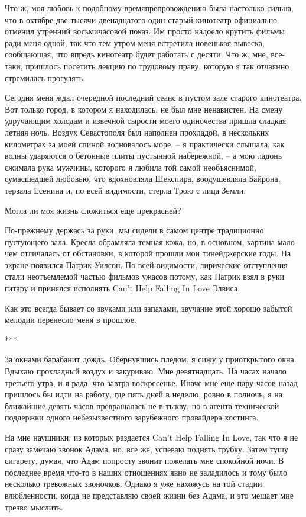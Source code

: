 \documentclass[
]{book}
\begin{document}
Что ж, моя любовь к подобному времяпрепровождению была настолько сильна, что в октябре две тысячи двенадцатого один старый кинотеатр официально отменил утренний восьмичасовой показ. Им просто надоело крутить фильмы ради меня одной, так что тем утром меня встретила новенькая вывеска, сообщающая, что впредь кинотеатр будет работать с десяти. Что ж, мне, все-таки, пришлось посетить лекцию по трудовому праву, которую я так отчаянно стремилась прогулять.

Сегодня меня ждал очередной последний сеанс в пустом зале старого кинотеатра. Вот только город, в котором я находилась, не был мне ненавистен. На смену удручающим холодам и извечной сырости моего одиночества пришла сладкая летняя ночь. Воздух Севастополя был наполнен прохладой, в нескольких километрах за моей спиной волновалось море, -- я практически слышала, как волны ударяются о бетонные плиты пустынной набережной, -- а мою ладонь сжимала рука мужчины, которого я любила той самой необъяснимой, сумасшедшей любовью, что вдохновляла Шекспира, воодушевляла Байрона, терзала Есенина и, по всей видимости, стерла Трою с лица Земли.

Могла ли моя жизнь сложиться еще прекрасней?

По-прежнему держась за руки, мы сидели в самом центре традиционно пустующего зала. Кресла обрамляла темная кожа, но, в основном, картина мало чем отличалась от обстановки, в которой прошли мои тинейджерские годы. На экране появился Патрик Уилсон. По всей видимости, лирические отступления стали неотъемлемой частью фильмов ужасов потому, как Патрик взял в руки гитару и принялся исполнять Can't Help Falling In Love Элвиса.

Как это всегда бывает со звуками или запахами, звучание этой хорошо забытой мелодии перенесло меня в прошлое.

***

За окнами барабанит дождь. Обернувшись пледом, я сижу у приоткрытого окна. Вдыхаю прохладный воздух и закуриваю. Мне девятнадцать. На часах начало третьего утра, и я рада, что завтра воскресенье. Иначе мне еще пару часов назад пришлось бы идти на работу, где пять дней в неделю, ровно в полночь, я на ближайшие девять часов превращалась не в тыкву, но в агента технической поддержки одного небезызвестного зарубежного провайдера хостинга.

На мне наушники, из которых раздается Can't Help Falling In Love, так что я не сразу замечаю звонок Адама, но, все же, успеваю поднять трубку. Затем тушу сигарету, думая, что Адам попросту звонит пожелать мне спокойной ночи. В последнее время что-то в наших отношениях явно не заладилось и тому было несколько тревожных звоночков. Однако я уже нахожусь на той стадии влюбленности, когда не представляю своей жизни без Адама, и это мешает мне трезво мыслить.
\end{document}
